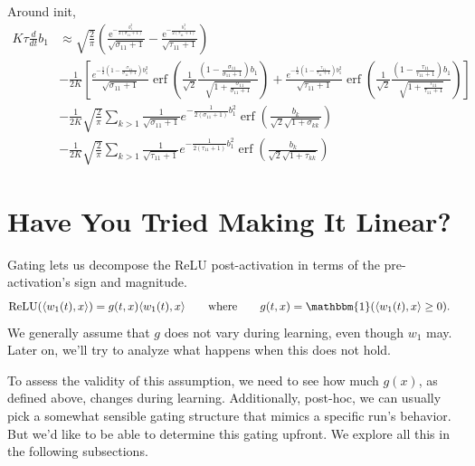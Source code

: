 \documentclass{article}
\begin{document}
Around init,
\begin{align*}
  K \tau \frac{d}{d t} b_1
  &\approx \sqrt{\frac{2}{\pi}} \left( \frac{\mathrm{e}^{-\frac{b_1^2}{2({\sigma}_{11}+1)}}}{\sqrt{{\sigma}_{11}+1}} - \frac{\mathrm{e}^{-\frac{b_1^2}{2({\tau}_{11}+1)}}}{\sqrt{{\tau}_{11}+1}} \right) \\
  & -\frac{1}{2K} \left[ \frac{e^{-\frac{1}{2}\left(1-\frac{\sigma_{11}}{\sigma_{11}+1}\right)b_{1}^{2}}}{\sqrt{\sigma_{11}+1}}\operatorname{erf}\left(\frac{1}{\sqrt{2}}\frac{\left(1-\frac{\sigma_{11}}{\sigma_{11}+1}\right)b_{1}}{\sqrt{1+\frac{\sigma_{11}}{\sigma_{11}+1}}}\right) + \frac{e^{-\frac{1}{2}\left(1-\frac{\tau_{11}}{\tau_{11}+1}\right)b_{1}^{2}}}{\sqrt{\tau_{11}+1}}\operatorname{erf}\left(\frac{1}{\sqrt{2}}\frac{\left(1-\frac{\tau_{11}}{\tau_{11}+1}\right)b_{1}}{\sqrt{1+\frac{\tau_{11}}{\tau_{11}+1}}}\right) \right] \\
  & -\frac{1}{2K} \sqrt{\frac{2}{\pi}} \sum_{k>1} \frac{1}{\sqrt{\sigma_{11}+1}}e^{-\frac{1}{2\left(\sigma_{11}+1\right)}b_{1}^{2}}\operatorname{erf}\left(\frac{b_k}{\sqrt{2}\sqrt{1+\sigma_{kk}}} \right) \\
  & -\frac{1}{2K} \sqrt{\frac{2}{\pi}} \sum_{k>1} \frac{1}{\sqrt{\tau_{11}+1}}e^{-\frac{1}{2\left(\tau_{11}+1\right)}b_{1}^{2}}\operatorname{erf}\left(\frac{b_k}{\sqrt{2}\sqrt{1+\tau_{kk}}} \right)
\end{align*}





\section{Have You Tried Making It Linear?}

Gating lets us decompose the ReLU post-activation in terms of the pre-activation's sign and magnitude.
\begin{align}
  \text{ReLU}(\langle w_1(t), x \rangle)
  &= g(t, x) \langle w_1(t), x \rangle \qquad \text{where} \qquad g(t, x) = \mathbbm{1}( \langle w_1(t), x \rangle \geq 0 ). \label{eq:relu_gating}
\end{align}
We generally assume that $g$ does not vary during learning, even though $w_1$ may.
Later on, we'll try to analyze what happens when this does not hold.

To assess the validity of this assumption, we need to see how much $g(x)$, as defined above, changes during learning.
Additionally, post-hoc, we can usually pick a somewhat sensible gating structure that mimics a specific run's behavior.
But we'd like to be able to determine this gating upfront.
We explore all this in the following subsections.
\end{document}
